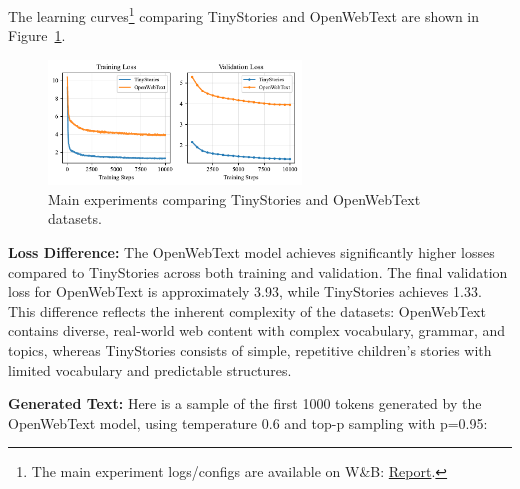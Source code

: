 \begin{answer}

The learning curves\footnote{The main experiment logs/configs are available on W\&B: \href{https://api.wandb.ai/links/donglinkang2021-beijing-institute-of-technology/k1na9uic}{Report}.} comparing TinyStories and OpenWebText are shown in Figure~\ref{fig:main_experiments}.

\begin{figure}[!htb]
    \centering
    \includegraphics[width=0.6\textwidth]{images/main_experiments.pdf}
    \caption{Main experiments comparing TinyStories and OpenWebText datasets.}
    \label{fig:main_experiments}
\end{figure}

\textbf{Loss Difference:} The OpenWebText model achieves significantly higher losses compared to TinyStories across both training and validation. The final validation loss for OpenWebText is approximately 3.93, while TinyStories achieves 1.33. This difference reflects the inherent complexity of the datasets: OpenWebText contains diverse, real-world web content with complex vocabulary, grammar, and topics, whereas TinyStories consists of simple, repetitive children's stories with limited vocabulary and predictable structures.

\textbf{Generated Text:} Here is a sample of the first 1000 tokens generated by the OpenWebText model, using temperature 0.6 and top-p sampling with p=0.95:


\end{answer}
